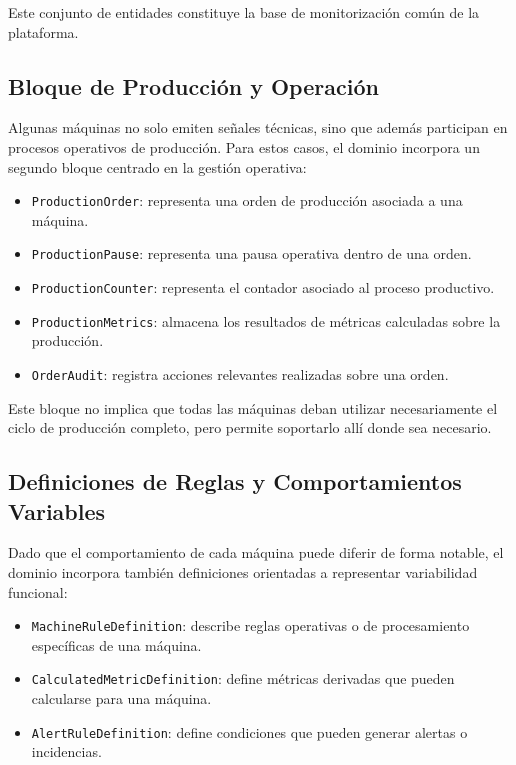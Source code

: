 Este conjunto de entidades constituye la base de monitorización común de la plataforma.

\subsection{Bloque de Producción y Operación}

Algunas máquinas no solo emiten señales técnicas, sino que además participan en procesos operativos de producción. Para estos casos, el dominio incorpora un segundo bloque centrado en la gestión operativa:

\begin{itemize}
    \item \texttt{ProductionOrder}: representa una orden de producción asociada a una máquina.
    \item \texttt{ProductionPause}: representa una pausa operativa dentro de una orden.
    \item \texttt{ProductionCounter}: representa el contador asociado al proceso productivo.
    \item \texttt{ProductionMetrics}: almacena los resultados de métricas calculadas sobre la producción.
    \item \texttt{OrderAudit}: registra acciones relevantes realizadas sobre una orden.
\end{itemize}

Este bloque no implica que todas las máquinas deban utilizar necesariamente el ciclo de producción completo, pero permite soportarlo allí donde sea necesario.

\subsection{Definiciones de Reglas y Comportamientos Variables}

Dado que el comportamiento de cada máquina puede diferir de forma notable, el dominio incorpora también definiciones orientadas a representar variabilidad funcional:

\begin{itemize}
    \item \texttt{MachineRuleDefinition}: describe reglas operativas o de procesamiento específicas de una máquina.
    \item \texttt{CalculatedMetricDefinition}: define métricas derivadas que pueden calcularse para una máquina.
    \item \texttt{AlertRuleDefinition}: define condiciones que pueden generar alertas o incidencias.
\end{itemize}

